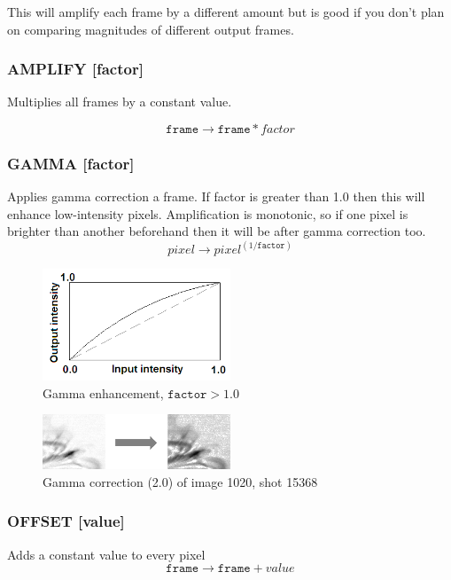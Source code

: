\documentclass[12pt, a4paper]{article}
\begin{document}
This will amplify each frame by a different amount but is good if you don't plan
on comparing magnitudes of different output frames.

\subsubsection{AMPLIFY [factor]}

Multiplies all frames by a constant value. 

\[
\texttt{frame}\rightarrow\texttt{frame}*factor
\]

\subsubsection{GAMMA [factor]}
Applies gamma correction a frame. If factor is greater than 1.0 then this will
enhance low-intensity pixels. Amplification is monotonic, so if one pixel is brighter than another
beforehand then it will be after gamma correction too.
\[
pixel \rightarrow pixel^{(1/\texttt{factor})}
\]

\begin{figure}[ht]
\centering
\includegraphics[width=0.5\textwidth]{gamma.png}
\caption{Gamma enhancement, $\texttt{factor} > 1.0$}
\end{figure}

\begin{figure}[ht]
\centering
\includegraphics[width=0.5\textwidth]{gamma_eg.png}
\caption{Gamma correction (2.0) of image 1020, shot 15368}
\end{figure}

\subsubsection{OFFSET [value]}
Adds a constant value to every pixel
\[
\texttt{frame}\rightarrow\texttt{frame} + value
\]
\end{document}
